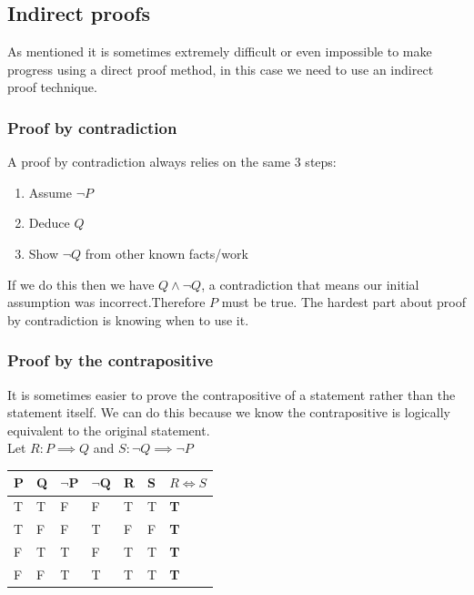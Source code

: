 \documentclass[12pt]{article}
\begin{document}
\subsection*{Indirect proofs}
As mentioned it is sometimes extremely difficult or even impossible to make progress using a direct proof method, in this case we need to use an indirect proof technique.
\subsubsection*{Proof by contradiction}
A proof by contradiction always relies on the same 3 steps:
\begin{enumerate}
    \item Assume \(\lnot P\)
    \item Deduce \(Q\)
    \item Show \(\lnot Q\) from other known facts/work
\end{enumerate}
If we do this then we have \(Q \land\lnot Q\), a contradiction that means our initial assumption was incorrect.Therefore \(P\) must be true. The hardest part about proof by contradiction is knowing when to use it.
\subsubsection*{Proof by the contrapositive}
It is sometimes easier to prove the contrapositive of a statement rather than the statement itself. We can do this because we know the contrapositive is logically equivalent to the original statement.
\\
Let \(R:P\implies Q\) and \(S: \lnot Q\implies\lnot P \)
\begin{table}[H]
    \begin{tabular}{|l|l|l|l|l|l|l|}
        \hline
        \textbf{P} & \textbf{Q} & \(\lnot \textbf{P}\) & \(\lnot\textbf{Q}\) & \textbf{R} & \textbf{S} & \(R\iff S\) \\ \hline
        T & T & F & F & T & T & \textbf{T} \\ \hline
        T & F & F & T & F & F & \textbf{T} \\ \hline
        F & T & T & F & T & T & \textbf{T} \\ \hline
        F & F & T & T & T & T & \textbf{T} \\ \hline
    \end{tabular}
\end{table}
\end{document}
